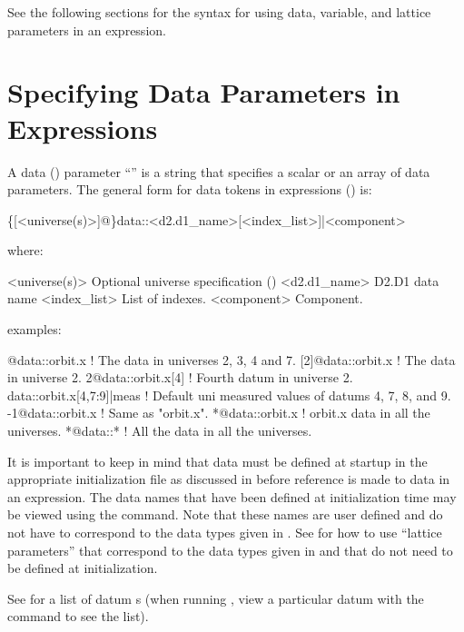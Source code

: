 See the following sections for the syntax for using data, variable, and
lattice parameters in an expression.

\section{Specifying Data Parameters in Expressions}
\label{s:data.token}

A data () parameter ``'' is a string that specifies a scalar or an array
of data parameters.  The general form for data tokens in expressions
() is:
\begin{example}
  \{[<universe(s)>]@\}data::<d2.d1_name>[<index_list>]|<component>
\end{example}
where:
\begin{example}
  <universe(s)>       Optional universe specification ()
  <d2.d1_name>        D2.D1 data name
  <index_list>        List of indexes.
  <component>         Component. 
\end{example}
examples:
\begin{example}
  [2:4,7]@data::orbit.x      ! The  data in universes 2, 3, 4 and 7.
  [2]@data::orbit.x          ! The  data in universe 2. 
  2@data::orbit.x[4]         ! Fourth  datum in universe 2.
  data::orbit.x[4,7:9]|meas  ! Default uni measured values of datums 4, 7, 8, and 9.
  -1@data::orbit.x           ! Same as "orbit.x".
  *@data::orbit.x            ! orbit.x data in all the universes.
  *@data::*                  ! All the data in all the universes.
\end{example}

It is important to keep in mind that data must be defined at startup in the appropriate
initialization file as discussed in  before reference is made to data in
an expression. The  data names that have been defined at initialization
time may be viewed using the  command. Note that these names are user
defined and do not have to correspond to the data types given in . See
 for how to use ``lattice parameters'' that correspond to the data types
given in  and that do not need to be defined at initialization.

See  for a list of datum s (when
running \tao, view a particular datum with the  command to see the list).

